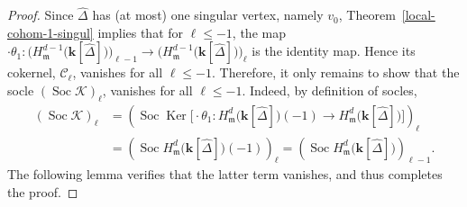 \documentclass[10pt]{amsart}
\theoremstyle{definition}
\providecommand{\C}{\mathcal C}
\DeclareMathOperator{\Soc}{Soc}
\DeclareMathOperator\Ker{Ker}
\newcommand{\complet}[1]{\hat{#1}}
\newcommand{\field}{\mathbf{k}}
\renewcommand{\C}{{\mathcal C}}
\newcommand{\K}{{\mathcal K}}
\newcommand{\mideal}{\ensuremath{\mathfrak{m}}}
\begin{document}
\begin{proof}
Since $\complet{\Delta}$ has (at most) one singular vertex, namely $v_0$, Theorem~\ref{local-cohom-1-singul} implies that for $\ell\leq -1$, the map $\cdot\theta_1: \big(H^{d-1}_\mideal\big(\field[\complet{\Delta}]\big)\big)_{\ell-1}\to \big(H^{d-1}_\mideal\big(\field[\complet{\Delta}]\big)\big)_{\ell}$ is the identity map. Hence its cokernel, $\C_\ell$, vanishes for all $\ell\leq -1$. Therefore, it only remains to show that the socle $(\Soc \K)_\ell$, vanishes for all $\ell\leq -1$. Indeed, by definition of socles,
\begin{align*}
(\Soc \K)_\ell &=\left(\Soc \Ker \big[\cdot \theta_1: H^{d}_\mideal\big(\field[\complet{\Delta}]\big)(-1) \longrightarrow H^{d}_\mideal\big(\field[\complet{\Delta}]\big)\big]\right)_\ell \\
&= \left(\Soc H^{d}_\mideal\big(\field[\complet{\Delta}]\big)(-1)\right)_\ell=\left(\Soc H^{d}_\mideal\big(\field[\complet{\Delta}]\big)\right)_{\ell-1}.
\end{align*}
The following lemma verifies that the latter term vanishes, and thus completes the proof. 
\end{proof}
\end{document}
